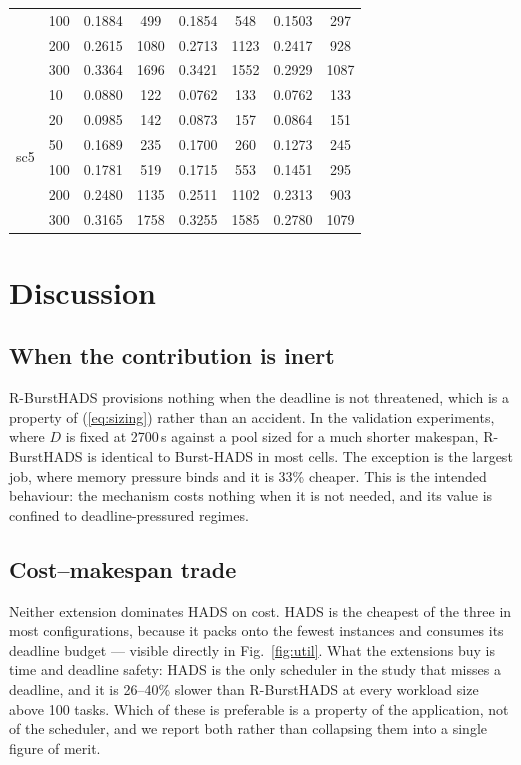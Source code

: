\documentclass[conference]{IEEEtran}
\begin{document}
\begin{table}[t]
\begin{tabular}{llcccccc}
 & 100 & 0.1884 & 499 & 0.1854 & 548 & 0.1503 & 297 \\
 & 200 & 0.2615 & 1080 & 0.2713 & 1123 & 0.2417 & 928 \\
 & 300 & 0.3364 & 1696 & 0.3421 & 1552 & 0.2929 & 1087 \\
\midrule
\multirow{6}{*}{sc5} & 10 & 0.0880 & 122 & 0.0762 & 133 & 0.0762 & 133 \\
 & 20 & 0.0985 & 142 & 0.0873 & 157 & 0.0864 & 151 \\
 & 50 & 0.1689 & 235 & 0.1700 & 260 & 0.1273 & 245 \\
 & 100 & 0.1781 & 519 & 0.1715 & 553 & 0.1451 & 295 \\
 & 200 & 0.2480 & 1135 & 0.2511 & 1102 & 0.2313 & 903 \\
 & 300 & 0.3165 & 1758 & 0.3255 & 1585 & 0.2780 & 1079 \\
\bottomrule
\end{tabular}
\end{table}

\section{Discussion}

\subsection{When the contribution is inert}

R-BurstHADS provisions nothing when the deadline is not threatened, which is a
property of (\ref{eq:sizing}) rather than an accident. In the validation
experiments, where $D$ is fixed at 2700\,s against a pool sized for a much
shorter makespan, R-BurstHADS is identical to Burst-HADS in most cells. The
exception is the largest job, where memory pressure binds and it is 33\%
cheaper. This is the intended behaviour: the mechanism costs nothing when it is
not needed, and its value is confined to deadline-pressured regimes.

\subsection{Cost--makespan trade}

Neither extension dominates HADS on cost. HADS is the cheapest of the three in
most configurations, because it packs onto the fewest instances and consumes its
deadline budget --- visible directly in Fig.~\ref{fig:util}. What the extensions
buy is time and deadline safety: HADS is the only scheduler in the study that
misses a deadline, and it is 26--40\% slower than R-BurstHADS at every workload
size above 100 tasks. Which of these is preferable is a property of the
application, not of the scheduler, and we report both rather than collapsing
them into a single figure of merit.
\end{document}
